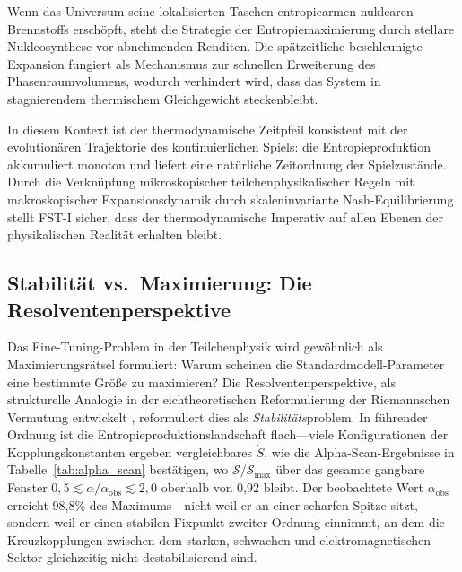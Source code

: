 \documentclass[12pt,a4paper]{article}
\theoremstyle{remark}
\begin{document}
Wenn das Universum seine lokalisierten Taschen entropiearmen nuklearen Brennstoffs ersch\"opft, steht die Strategie der Entropiemaximierung durch stellare Nukleosynthese vor abnehmenden Renditen. Die sp\"atzeitliche beschleunigte Expansion fungiert als Mechanismus zur schnellen Erweiterung des Phasenraumvolumens, wodurch verhindert wird, dass das System in stagnierendem thermischem Gleichgewicht steckenbleibt.

In diesem Kontext ist der thermodynamische Zeitpfeil konsistent mit der evolution\"aren Trajektorie des kontinuierlichen Spiels: die Entropieproduktion akkumuliert monoton und liefert eine nat\"urliche Zeitordnung der Spielzust\"ande. Durch die Verkn\"upfung mikroskopischer teilchenphysikalischer Regeln mit makroskopischer Expansionsdynamik durch skaleninvariante Nash-Equilibrierung stellt FST-I sicher, dass der thermodynamische Imperativ auf allen Ebenen der physikalischen Realit\"at erhalten bleibt.

\subsection{Stabilit\"at vs.\ Maximierung: Die Resolventenperspektive}

Das Fine-Tuning-Problem in der Teilchenphysik wird gew\"ohnlich als Maximierungsr\"atsel formuliert: Warum scheinen die Standardmodell-Parameter eine bestimmte Gr\"o\ss{}e zu maximieren? Die Resolventenperspektive, als strukturelle Analogie in der eichtheoretischen Reformulierung der Riemannschen Vermutung entwickelt \citep{GeigerRH2026b}, reformuliert dies als \emph{Stabilit\"ats}problem. In f\"uhrender Ordnung ist die Entropieproduktionslandschaft flach---viele Konfigurationen der Kopplungskonstanten ergeben vergleichbares $\dot{S}$, wie die Alpha-Scan-Ergebnisse in Tabelle~\ref{tab:alpha_scan} best\"atigen, wo $\mathcal{S}/\mathcal{S}_{\text{max}}$ \"uber das gesamte gangbare Fenster $0{,}5 \lesssim \alpha/\alpha_{\text{obs}} \lesssim 2{,}0$ oberhalb von 0,92 bleibt. Der beobachtete Wert $\alpha_{\text{obs}}$ erreicht 98,8\% des Maximums---nicht weil er an einer scharfen Spitze sitzt, sondern weil er einen stabilen Fixpunkt zweiter Ordnung einnimmt, an dem die Kreuzkopplungen zwischen dem starken, schwachen und elektromagnetischen Sektor gleichzeitig nicht-destabilisierend sind.
\end{document}
